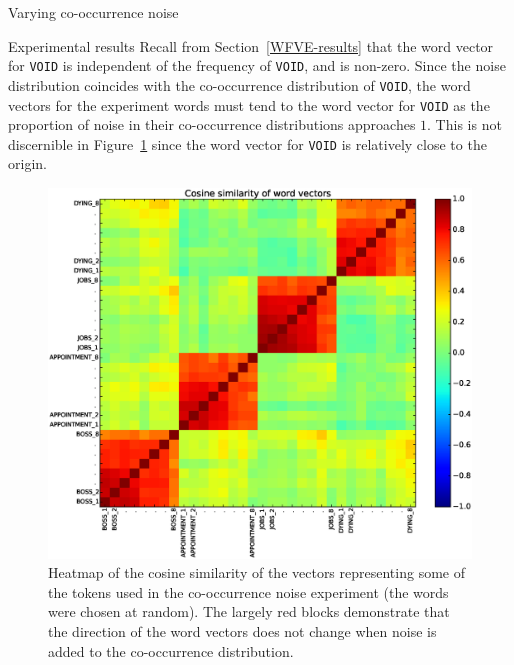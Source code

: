\documentclass{article} %
\newcommand{\word}[1]{\texttt{#1}}
\begin{document}
\begin{section}{Varying co-occurrence noise}
\begin{subsection}{Experimental results}
Recall from Section~\ref{WFVE-results} that the word vector for \word{VOID} is independent of the frequency of \word{VOID}, and is non-zero.
Since the noise distribution coincides with the co-occurrence distribution of \word{VOID}, the word vectors for the experiment words must tend to the word vector for \word{VOID} as the proportion of noise in their co-occurrence distributions approaches $1$.
This is not discernible in Figure~\ref{fig:co-occurrence-noise-heatmap} since the word vector for \word{VOID} is relatively close to the origin.

\begin{figure}
	\includegraphics[scale=0.5]{cooccurrence-noise-heatmap}
	\caption{ Heatmap of the cosine similarity of the vectors
          representing some of the tokens used in the co-occurrence
          noise experiment (the words were chosen at random).  The
          largely red blocks demonstrate that the direction of the word
          vectors does not change when noise is added to the
          co-occurrence distribution.  }
	\label{fig:co-occurrence-noise-heatmap}
\end{figure}


\end{subsection}
\end{section}
\end{document}
